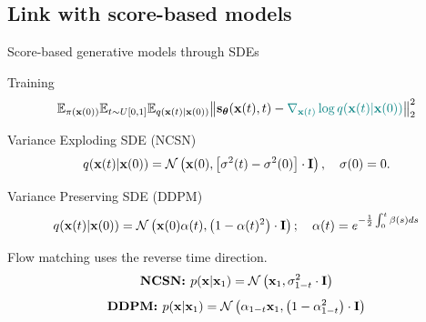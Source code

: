 \subsection{Link with score-based models}
\begin{frame}{Score-based generative models through SDEs}
	\vspace{-0.3cm}
	\begin{block}{Training}
		\vspace{-0.7cm}
		\[
			\mathbb{E}_{\pi(\mathbf{x}(0))} \mathbb{E}_{t \sim U[0, 1]} \mathbb{E}_{q(\mathbf{x}(t) | \mathbf{x}(0))}\bigl\| \mathbf{s}_{\boldsymbol{\theta}}(\mathbf{x}(t), t) - {\color{teal}\nabla_{\mathbf{x}(t)} \log q(\mathbf{x}(t) | \mathbf{x}(0))} \bigr\|^2_2 
		\]
		\vspace{-0.5cm}
	\end{block}
	\begin{block}{Variance Exploding SDE (NCSN)}
		\vspace{-0.3cm}
		\[
			q(\mathbf{x}(t) | \mathbf{x}(0)) = \mathcal{N}\left(\mathbf{x}(0), \left[\sigma^2(t) - \sigma^2(0)\right] \cdot \mathbf{I}\right), \quad \sigma(0) =0.
		\]
		\vspace{-0.5cm}
	\end{block}
	\begin{block}{Variance Preserving SDE (DDPM)}
		\vspace{-0.5cm}
		\[
			q(\mathbf{x}(t) | \mathbf{x}(0)) = \mathcal{N}\left(\mathbf{x}(0) \alpha(t), \left(1 - \alpha(t)^2\right) \cdot \mathbf{I}\right); \quad \alpha(t) = e^{-\frac{1}{2} \int_0^t \beta(s) ds}
		\]
		\vspace{-0.5cm}
	\end{block}
	Flow matching uses the reverse time direction.
	\[
		\textbf{NCSN: } p(\mathbf{x} | \mathbf{x}_1) = \mathcal{N}\left(\mathbf{x}_1, \sigma^2_{1-t} \cdot \mathbf{I}\right)
	\]
	\vspace{-0.5cm}
	\[
		\textbf{DDPM: } p(\mathbf{x} | \mathbf{x}_1) = \mathcal{N}\left(\alpha_{1-t} \mathbf{x}_1, \left(1 - \alpha_{1-t}^2\right) \cdot \mathbf{I}\right)
	\]
	\vspace{-0.5cm}
\end{frame}

